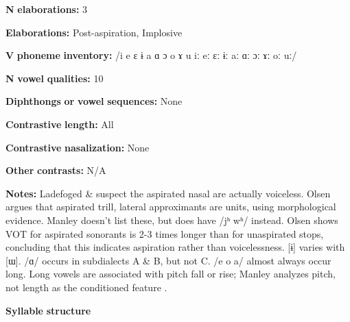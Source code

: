 \documentclass[output=paper]{langsci/langscibook}
\begin{document}
\begin{styleBody}
\textbf{N} \textbf{elaborations:} 3
\end{styleBody}

\begin{styleBody}
\textbf{Elaborations:} Post-aspiration, Implosive
\end{styleBody}

\begin{styleBody}
\textbf{V} \textbf{phoneme} \textbf{inventory:} /i e ɛ ɨ a ɑ ɔ o ɤ u iː eː ɛː ɨː aː ɑː ɔː ɤː oː uː/
\end{styleBody}

\begin{styleBody}
\textbf{N} \textbf{vowel} \textbf{qualities:} 10
\end{styleBody}

\begin{styleBody}
\textbf{Diphthongs} \textbf{or} \textbf{vowel} \textbf{sequences:} None
\end{styleBody}

\begin{styleBody}
\textbf{Contrastive} \textbf{length:} All
\end{styleBody}

\begin{styleBody}
\textbf{Contrastive} \textbf{nasalization:} None
\end{styleBody}

\begin{styleBody}
\textbf{Other} \textbf{contrasts:} N/A
\end{styleBody}

\begin{styleBody}
\textbf{Notes:} Ladefoged \& \citet[116]{Maddieson1996} suspect the aspirated nasal are actually voiceless. Olsen argues that aspirated trill, lateral approximants are units, using morphological evidence. Manley doesn’t list these, but does have /jʰ wʰ/ instead. Olsen shows VOT for aspirated sonorants is 2-3 times longer than for unaspirated stops, concluding that this indicates aspiration rather than voicelessness. [ɨ] varies with [ɯ]. /ɑ/ occurs in subdialects A \& B, but not C. /e o a/ almost always occur long. Long vowels are associated with pitch fall or rise; Manley analyzes pitch, not length as the conditioned feature \citep[15]{Manley1972}.
\end{styleBody}

\begin{styleBody}
\textbf{Syllable} \textbf{structure}
\end{styleBody}
\end{document}
